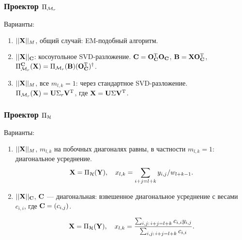 \documentclass[unicode, notheorems]{beamer}
\begin{document}
\begin{frame}
	\frametitle{Проектор $\Pi_{\mathcal{M}_r}$}
	Варианты:
	\begin{enumerate}
		\item $||\mathbf{X}||_M$, общий случай: EM-подобный алгоритм.
		\vspace{0.2cm}
        \item $||\mathbf{X}||_{\mathbf{C}}$: косоугольное SVD-разложение. $\mathbf{C} = \mathbf{O}_{\mathbf{C}}^{\mathrm{T}} \mathbf{O}_{\mathbf{C}}$, $\mathbf{B} = \mathbf{X} \mathbf{O}_{\mathbf{C}}^{\mathrm{T}}$, $\Pi_{\mathcal{M}_r}^{\mathbf{C}}(\mathbf{X}) = \Pi_{\mathcal{M}_r}(\mathbf{B})(\mathbf{O}_{\mathbf{C}}^{\mathrm{T}})^\dagger$.
        \vspace{0.2cm}		
		\item $||\mathbf{X}||_M$, все $m_{l, k} = 1$: через стандартное SVD-разложение. $\Pi_{\mathcal{M}_r}(\mathbf{X}) = \mathbf{U} \Sigma_r \mathbf{V}^{\mathrm{T}}$, где $\mathbf{X} = \mathbf{U} \Sigma \mathbf{V}^{\mathrm{T}}$.
	\end{enumerate}
\end{frame}

\begin{frame}
	\frametitle{Проектор $\Pi_{\mathcal{H}}$}
	Варианты:
	\begin{enumerate}
		\item $||\mathbf{X}||_M$, $m_{l,k}$ на побочных диагоналях равны, в частности $m_{l, k} = 1$: диагональное усреднение.
		\begin{equation*}
		\mathbf{X} = \Pi_{\mathcal{H}}(\mathbf{Y}), \quad x_{l,k} = \sum_{i + j = l + k} y_{i, j} / w_{l + k - 1}.
		\end{equation*}
		\item $||\mathbf{X}||_{\mathbf{C}}$, $\mathbf{C}$ --- диагональная: взвешенное диагональное усреднение с весами $c_{i, i}$, где $\mathbf{C} = (c_{i, j})$.
		
		\begin{equation*}
		\mathbf{X} = \Pi_{\mathcal{H}}(\mathbf{Y}), \quad x_{l,k} = \frac{\sum_{i,j:\, i+j=l+k} c_{i,i} y_{i,j}}{\sum_{i,j:\, i+j=l+k} c_{i,i}}.
		\end{equation*}
	\end{enumerate}
\end{frame}
\end{document}
